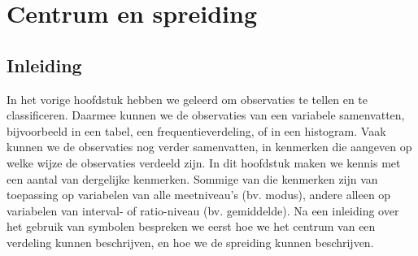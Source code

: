 \documentclass[
]{book}
\newenvironment{Shaded}{\begin{snugshade}}{\end{snugshade}}
\newcommand{\CommentTok}[1]{\textcolor[rgb]{0.56,0.35,0.01}{\textit{#1}}}
\newcommand{\DataTypeTok}[1]{\textcolor[rgb]{0.13,0.29,0.53}{#1}}
\newcommand{\DecValTok}[1]{\textcolor[rgb]{0.00,0.00,0.81}{#1}}
\newcommand{\FloatTok}[1]{\textcolor[rgb]{0.00,0.00,0.81}{#1}}
\newcommand{\KeywordTok}[1]{\textcolor[rgb]{0.13,0.29,0.53}{\textbf{#1}}}
\newcommand{\NormalTok}[1]{#1}
\newcommand{\OperatorTok}[1]{\textcolor[rgb]{0.81,0.36,0.00}{\textbf{#1}}}
\newcommand{\StringTok}[1]{\textcolor[rgb]{0.31,0.60,0.02}{#1}}
\begin{document}
\begin{Shaded}
\end{Shaded}

\hypertarget{ch:centrumenspreiding}{%
\chapter{Centrum en spreiding}\label{ch:centrumenspreiding}}

\hypertarget{inleiding-4}{%
\section{Inleiding}\label{inleiding-4}}

In het vorige hoofdstuk hebben we geleerd om observaties te tellen en te
classificeren. Daarmee kunnen we de observaties van een variabele
samenvatten, bijvoorbeeld in een tabel, een frequentieverdeling, of in
een histogram. Vaak kunnen we de observaties nog verder samenvatten, in
kenmerken die aangeven op welke wijze de observaties verdeeld zijn. In
dit hoofdstuk maken we kennis met een aantal van dergelijke kenmerken.
Sommige van die kenmerken zijn van toepassing op variabelen van alle
meetniveau's (bv. modus), andere alleen op variabelen van interval- of
ratio-niveau (bv. gemiddelde). Na een inleiding over het gebruik van
symbolen bespreken we eerst hoe we het centrum van een verdeling kunnen
beschrijven, en hoe we de spreiding kunnen beschrijven.
\end{document}
